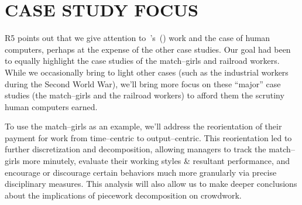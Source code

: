 \documentclass[11pt]{article}
\begin{document}
\section*{CASE STUDY FOCUS}
R5 points out that we give attention to~\citeauthor{grier2013computers}'s~(\citeyear{grier2013computers}) work and
the case of human computers,
perhaps at the expense of the other case studies.
Our goal had been to equally highlight the case studies of
the match--girls and railroad workers.
While we occasionally bring to light other cases
(such as the industrial workers during the Second World War),
we'll bring more focus on these ``major'' case studies
(the match--girls and the railroad workers)
to afford them
the scrutiny human computers earned.

To use the match--girls as an example, we'll address
the reorientation of their payment for work from
time--centric to
output--centric.
This reorientation led to further discretization and decomposition,
allowing managers
to track the match--girls more minutely,
evaluate their working styles \& resultant performance,
and encourage or discourage certain behaviors much more granularly via
precise disciplinary measures.
This analysis will also
allow us to make deeper conclusions about
the implications of piecework decomposition on crowdwork.

\end{document}
